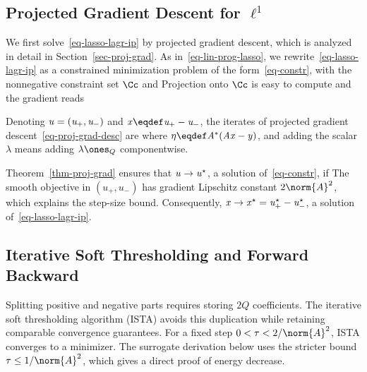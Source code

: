 \subsection{Projected Gradient Descent for \texorpdfstring{$\ell^1$}{l1}}

We first solve~\eqref{eq-lasso-lagr-ip} by projected gradient descent, which is analyzed in detail in Section~\ref{sec-proj-grad}.
%
As in~\eqref{eq-lin-prog-lasso}, we rewrite~\eqref{eq-lasso-lagr-ip} as a constrained minimization problem of the form~\eqref{eq-constr}, with the nonnegative constraint set $\Cc$ and
Projection onto $\Cc$ is easy to compute
and the gradient reads

Denoting $\it{u} = (\it{u_+},\it{u_-})$ and $\it{x} \eqdef \it{u_+}-\it{u_-}$, the iterates of projected gradient descent~\eqref{eq-proj-grad-desc} are
where $\it{\eta}\eqdef A^*(A\it{x}-y)$, and adding the scalar $\lambda$ means adding $\lambda\ones_Q$ componentwise.

Theorem~\ref{thm-proj-grad} ensures that $\it{u} \rightarrow u^\star$, a solution of~\eqref{eq-constr}, if
The smooth objective in $(u_+,u_-)$ has gradient Lipschitz constant $2\norm{A}^2$, which explains the step-size bound. Consequently, $\it{x} \rightarrow x^\star = u_+^\star-u_-^\star$, a solution of~\eqref{eq-lasso-lagr-ip}.


\subsection{Iterative Soft Thresholding and Forward Backward}
\label{sec-ista}

Splitting positive and negative parts requires storing $2Q$ coefficients. The iterative soft thresholding algorithm (ISTA) avoids this duplication while retaining comparable convergence guarantees.
%
For a fixed step $0<\tau<2/\norm{A}^2$, ISTA converges to a minimizer. The surrogate derivation below uses the stricter bound $\tau\leq1/\norm{A}^2$, which gives a direct proof of energy decrease.

